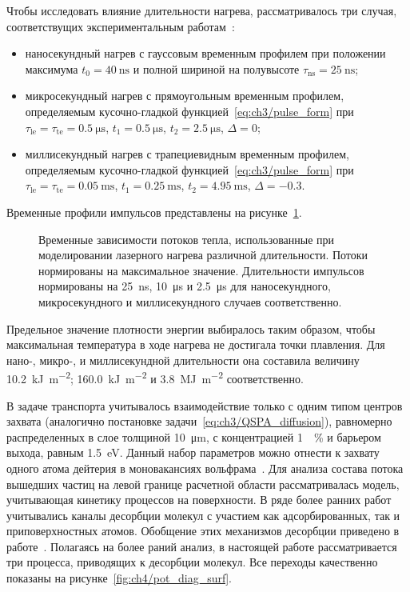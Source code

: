 Чтобы исследовать влияние длительности нагрева, рассматривалось три случая, соответствущих экспериментальным работам~\cite{Zlobinski2019,Zlobinski2020,Gasparyan2021}:
\begin{itemize}
    \item наносекундный нагрев с гауссовым временным профилем при положении максимума \( t_0 = \SI{40}{\nano\second} \) и полной шириной на полувысоте \(\tau_\mathrm{ns}=\SI{25}{\nano\second} \);
    \item микросекундный нагрев с прямоугольным временным профилем, определяемым кусочно-гладкой функцией~\cref{eq:ch3/pulse_form} при \(\tau_\mathrm{le}=\tau_\mathrm{te}=\SI{0.5}{\micro\second}\), \(t_1=\SI{0.5}{\micro\second}\), \( t_2=\SI{2.5}{\micro\second}\), \( \Delta=\num{0} \);
    \item миллисекундный нагрев с трапециевидным временным профилем, определяемым кусочно-гладкой функцией~\cref{eq:ch3/pulse_form} при \(\tau_\mathrm{le}=\tau_\mathrm{te}=\SI{0.05}{\milli\second}\), \(t_1=\SI{0.25}{\milli\second}\), \( t_2=\SI{4.95}{\milli\second}\), \( \Delta=\num{-0.3} \).
\end{itemize}
Временные профили импульсов представлены на рисунке~\cref{fig:ch4/laser_time_profiles}.
\begin{figure}[ht]
    \caption{Временные зависимости потоков тепла, использованные при моделировании лазерного нагрева различной длительности. Потоки нормированы на максимальное значение.  Длительности импульсов нормированы на \SI{25}{\nano\second}, \SI{10}{\micro\second} и \SI{2.5}{\micro\second} для наносекундного, микросекундного и миллисекундного случаев соответственно. }\label{fig:ch4/laser_time_profiles}
\end{figure}
Предельное значение плотности энергии выбиралось таким образом, чтобы максимальная температура в ходе нагрева не достигала точки плавления. Для нано-, микро-, и миллисекундной длительности она составила величину \SI{10,2}{\kilo\joule\per\meter\squared}; \SI{160.0}{\kilo\joule\per\meter\squared} и \SI{3,8}{\mega\joule\per\meter\squared} соответственно.

В задаче транспорта учитывалось взаимодействие только с одним типом центров захвата (аналогично постановке задачи~\cref{eq:ch3/QSPA_diffusion}), равномерно распределенных в слое толщиной \SI{10}{\micro\meter}, с концентрацией \SI{1}{\percent} и барьером выхода, равным \SI{1.5}{\electronvolt}. Данный набор параметров можно отнести к захвату одного атома дейтерия в моновакансиях вольфрама~\cite{Krat2018}. Для анализа состава потока вышедших частиц на левой границе расчетной области рассматривалась модель, учитывающая кинетику процессов на поверхности. В ряде более ранних работ учитывались каналы десорбции молекул с участием как адсорбированных, так и приповерхностных атомов. Обобщение этих механизмов десорбции приведено в работе~\cite{Pisarev1997}. Полагаясь на более раний анализ, в настоящей работе рассматривается три процесса, приводящих к десорбции молекул. Все переходы качественно показаны на рисунке~\cref{fig:ch4/pot_diag_surf}. 

